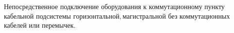 Непосредственное подключение оборудования к коммутационному
пункту кабельной подсистемы \(горизонтальной, магистральной\)
без коммутационных кабелей или перемычек.